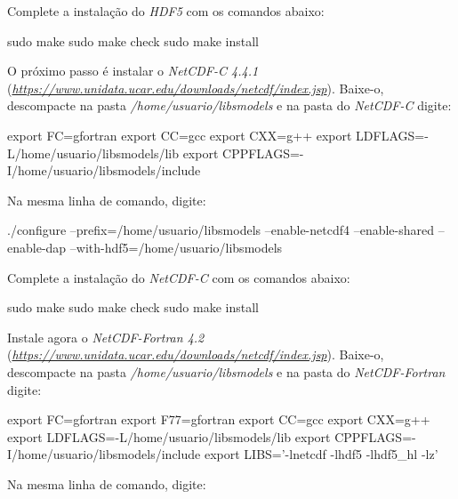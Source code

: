 \noindent Complete a instalação do \textit{HDF5} com os comandos abaixo:
\bigskip

\begin{bashcode}
sudo make
sudo make check
sudo make install
\end{bashcode}
\bigskip

\noindent O próximo passo é instalar o \textit{NetCDF-C 4.4.1} (\textcolor{bleu_cite}{\href{https://www.unidata.ucar.edu/downloads/netcdf/index.jsp}{\textit{https://www.unidata.ucar.edu/downloads/netcdf/index.jsp}}}). Baixe-o, descompacte na pasta \textit{/home/usuario/libsmodels} e na pasta do \textit{NetCDF-C} digite:
\bigskip

\begin{bashcode}[fontsize=\scriptsize]
export FC=gfortran
export CC=gcc
export CXX=g++
export LDFLAGS=-L/home/usuario/libsmodels/lib
export CPPFLAGS=-I/home/usuario/libsmodels/include
\end{bashcode}
\bigskip

\noindent Na mesma linha de comando, digite:
\bigskip

\begin{bashcode}[fontsize=\scriptsize]
./configure --prefix=/home/usuario/libsmodels --enable-netcdf4 --enable-shared --enable-dap
--with-hdf5=/home/usuario/libsmodels 
\end{bashcode}
\bigskip

\noindent Complete a instalação do \textit{NetCDF-C} com os comandos abaixo:
\bigskip

\begin{bashcode}
sudo make
sudo make check
sudo make install
\end{bashcode}
\bigskip

\noindent Instale agora o \textit{NetCDF-Fortran 4.2} (\textcolor{bleu_cite}{\href{https://www.unidata.ucar.edu/downloads/netcdf/index.jsp}{\textit{https://www.unidata.ucar.edu/downloads/netcdf/index.jsp}}}). Baixe-o, descompacte na pasta \textit{/home/usuario/libsmodels} e na pasta do \textit{NetCDF-Fortran} digite:
\bigskip

\begin{bashcode}[fontsize=\scriptsize]
export FC=gfortran
export F77=gfortran
export CC=gcc
export CXX=g++
export LDFLAGS=-L/home/usuario/libsmodels/lib
export CPPFLAGS=-I/home/usuario/libsmodels/include
export LIBS='-lnetcdf -lhdf5 -lhdf5_hl -lz'
\end{bashcode}
\bigskip

\noindent Na mesma linha de comando, digite:
\bigskip

